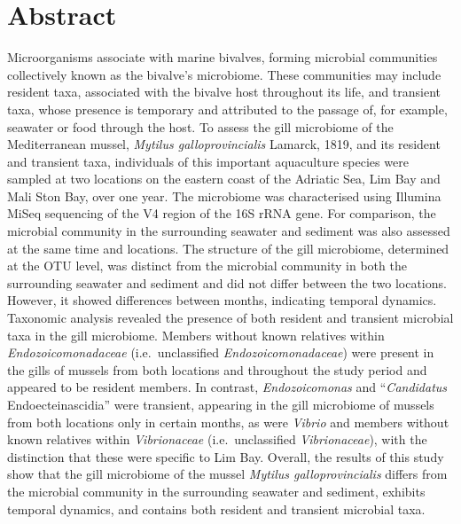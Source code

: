 \documentclass[
  12 pt,
]{article}
\begin{document}
\linenumbers


\setlength\parindent{24pt}

\newpage

\section{Abstract}\label{abstract}

Microorganisms associate with marine bivalves, forming microbial communities collectively known as the bivalve's microbiome. These communities may include resident taxa, associated with the bivalve host throughout its life, and transient taxa, whose presence is temporary and attributed to the passage of, for example, seawater or food through the host. To assess the gill microbiome of the Mediterranean mussel, \emph{Mytilus galloprovincialis} Lamarck, 1819, and its resident and transient taxa, individuals of this important aquaculture species were sampled at two locations on the eastern coast of the Adriatic Sea, Lim Bay and Mali Ston Bay, over one year. The microbiome was characterised using Illumina MiSeq sequencing of the V4 region of the 16S rRNA gene. For comparison, the microbial community in the surrounding seawater and sediment was also assessed at the same time and locations. The structure of the gill microbiome, determined at the OTU level, was distinct from the microbial community in both the surrounding seawater and sediment and did not differ between the two locations. However, it showed differences between months, indicating temporal dynamics. Taxonomic analysis revealed the presence of both resident and transient microbial taxa in the gill microbiome. Members without known relatives within \emph{Endozoicomonadaceae} (i.e.~unclassified \emph{Endozoicomonadaceae}) were present in the gills of mussels from both locations and throughout the study period and appeared to be resident members. In contrast, \emph{Endozoicomonas} and ``\emph{Candidatus} Endoecteinascidia'' were transient, appearing in the gill microbiome of mussels from both locations only in certain months, as were \emph{Vibrio} and members without known relatives within \emph{Vibrionaceae} (i.e.~unclassified \emph{Vibrionaceae}), with the distinction that these were specific to Lim Bay. Overall, the results of this study show that the gill microbiome of the mussel \emph{Mytilus galloprovincialis} differs from the microbial community in the surrounding seawater and sediment, exhibits temporal dynamics, and contains both resident and transient microbial taxa.
\end{document}
